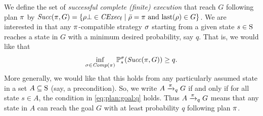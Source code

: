       
  


We define the set of \emph{successful complete (finite) execution}
that reach $G$ following plan $\plan$ by
$\Succ(\plan,G)=\{{\rho\complete\in\cexecf}\mid{\bar{\rho}=\plan
  \text{ and } \last(\rho)\in G}\}$.
%
We are interested in that any $\plan$-compatible strategy $\strat$
starting from a given state $s\in\S$ reaches a state in $G$ with a
minimum desired probability, say $q$.  That is, we would like that
%
\begin{equation}\label{eq:plan:goal:q}
  \inf_{\strat \in\Comp(\plan)}\Prob^\strat_s(\Succ(\plan,G)) \geq q.
\end{equation}
%
More generally, we would like that this holds from any particularly
assumed state in a set $A\subseteq\S$ (say, a precondition).  So, we
write $A \reach{\plan}_q G$ if and only if for all state $s\in A$,
the condition in \cref{eq:plan:goal:q} holds.
%
Thus $A \reach{\plan}_q G$ means that any state in $A$ can reach the
goal $G$ with at least probability $q$ following plan $\plan$.

